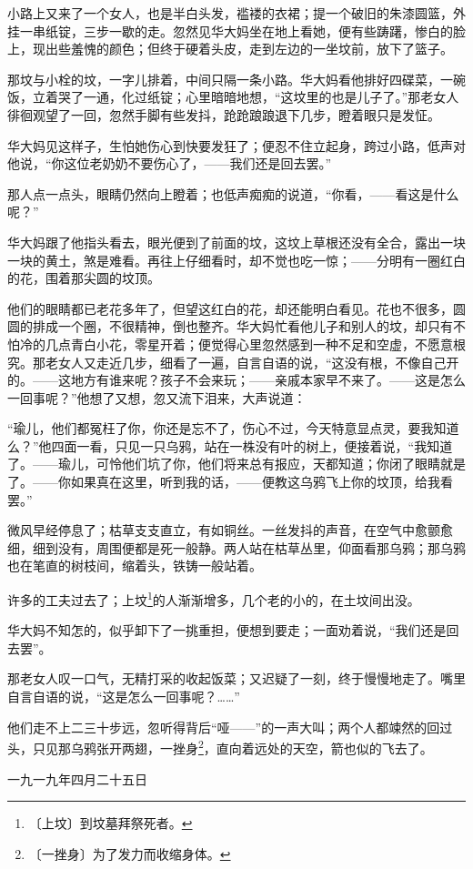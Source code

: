 \documentclass[12pt,UTF-8,openany]{ctexbook}
\begin{document}
\begin{normalsize}
    小路上又来了一个女人，也是半白头发，褴褛的衣裙；提一个破旧的朱漆圆篮，外挂一串纸锭，三步一歇的走。忽然见华大妈坐在地上看她，便有些踌躇，惨白的脸上，现出些羞愧的颜色；但终于硬着头皮，走到左边的一坐坟前，放下了篮子。
    
    那坟与小栓的坟，一字儿排着，中间只隔一条小路。华大妈看他排好四碟菜，一碗饭，立着哭了一通，化过纸锭；心里暗暗地想，“这坟里的也是儿子了。”那老女人徘徊观望了一回，忽然手脚有些发抖，跄跄踉踉退下几步，瞪着眼只是发怔。
    
    华大妈见这样子，生怕她伤心到快要发狂了；便忍不住立起身，跨过小路，低声对他说，“你这位老奶奶不要伤心了，——我们还是回去罢。”
    
    那人点一点头，眼睛仍然向上瞪着；也低声痴痴的说道，“你看，——看这是什么呢？”
    
    华大妈跟了他指头看去，眼光便到了前面的坟，这坟上草根还没有全合，露出一块一块的黄土，煞是难看。再往上仔细看时，却不觉也吃一惊；——分明有一圈红白的花，围着那尖圆的坟顶。
    
    他们的眼睛都已老花多年了，但望这红白的花，却还能明白看见。花也不很多，圆圆的排成一个圈，不很精神，倒也整齐。华大妈忙看他儿子和别人的坟，却只有不怕冷的几点青白小花，零星开着；便觉得心里忽然感到一种不足和空虚，不愿意根究。那老女人又走近几步，细看了一遍，自言自语的说，“这没有根，不像自己开的。——这地方有谁来呢？孩子不会来玩；——亲戚本家早不来了。——这是怎么一回事呢？”他想了又想，忽又流下泪来，大声说道：
    
    “瑜儿，他们都冤枉了你，你还是忘不了，伤心不过，今天特意显点灵，要我知道么？”他四面一看，只见一只乌鸦，站在一株没有叶的树上，便接着说，“我知道了。——瑜儿，可怜他们坑了你，他们将来总有报应，天都知道；你闭了眼睛就是了。——你如果真在这里，听到我的话，——便教这乌鸦飞上你的坟顶，给我看罢。”
    
    微风早经停息了；枯草支支直立，有如铜丝。一丝发抖的声音，在空气中愈颤愈细，细到没有，周围便都是死一般静。两人站在枯草丛里，仰面看那乌鸦；那乌鸦也在笔直的树枝间，缩着头，铁铸一般站着。
    
    许多的工夫过去了；上坟\footnote{〔上坟〕到坟墓拜祭死者。}的人渐渐增多，几个老的小的，在土坟间出没。
    
    华大妈不知怎的，似乎卸下了一挑重担，便想到要走；一面劝着说，“我们还是回去罢”。
    
    那老女人叹一口气，无精打采的收起饭菜；又迟疑了一刻，终于慢慢地走了。嘴里自言自语的说，“这是怎么一回事呢？……”
    
    他们走不上二三十步远，忽听得背后“哑——”的一声大叫；两个人都竦然的回过头，只见那乌鸦张开两翅，一挫身\footnote{〔一挫身〕为了发力而收缩身体。}，直向着远处的天空，箭也似的飞去了。
    
    \hfill 一九一九年四月二十五日
    
\end{normalsize}
\end{document}
